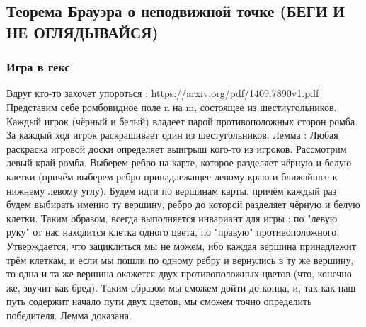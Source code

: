 ﻿\documentclass[12pt, a4paper]{article}
\newcommand{\nl}{\newline}
\begin{document}
    \subsection{Теорема Брауэра о неподвижной точке (БЕГИ И НЕ ОГЛЯДЫВАЙСЯ)}
        \subsubsection{Игра в гекс}
        Вдруг кто-то захочет упороться : \url{https://arxiv.org/pdf/1409.7890v1.pdf} \nl
        Представим себе ромбовидное поле n на m, состоящее из шестиугольников. Каждый игрок (чёрный и белый) владеет парой противоположных сторон ромба. За каждый ход игрок раскрашивает один из шестугольников. \nl
        Лемма : Любая раскраска игровой доски определяет выигрыш кого-то из игроков. \nl
        Рассмотрим левый край ромба. Выберем ребро на карте, которое разделяет чёрную и белую клетки (причём выберем ребро принадлежащее левому краю и ближайшее к нижнему левому углу). Будем идти по вершинам карты, причём каждый раз будем выбирать именно ту вершину, ребро до которой разделяет чёрную и белую клетки. Таким образом, всегда выполняется инвариант для игры : по "левую руку" от нас находится клетка одного цвета, по "правую" противоположного. Утверждается, что зациклиться мы не можем, ибо каждая вершина принадлежит трём клеткам, и если мы пошли по одному ребру и вернулись в ту же вершину, то одна и та же вершина окажется двух противоположных цветов (что, конечно же, звучит как бред). Таким образом мы сможем дойти до конца, и, так как наш путь содержит начало пути двух цветов, мы сможем точно определить победителя. Лемма доказана. \nl
        
\end{document}
